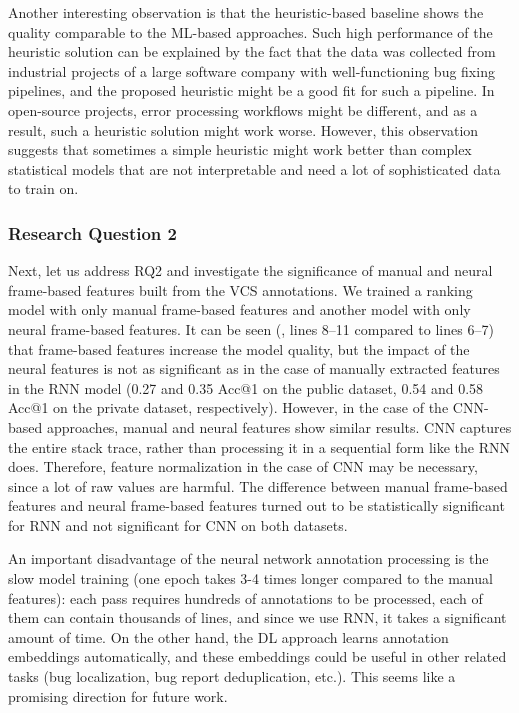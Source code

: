 Another interesting observation is that the heuristic-based baseline shows the quality comparable to the ML-based approaches. Such high performance of the heuristic solution can be explained by the fact that the data was collected from industrial projects of a large software company with well-functioning bug fixing pipelines, and the proposed heuristic might be a good fit for such a pipeline. In open-source projects, error processing workflows might be different, and as a result, such a heuristic solution might work worse. However, this observation suggests that sometimes a simple heuristic might work better than complex statistical models that are not interpretable and need a lot of sophisticated data to train on.


\subsubsection{Research Question 2} 
Next, let us address RQ2 and investigate the significance of manual and neural frame-based features built from the VCS annotations. We trained a ranking model with only manual frame-based features and another model with only neural frame-based features. It can be seen (, lines 8--11 compared to lines 6--7) that frame-based features increase the model quality, but the impact of the neural features is not as significant as in the case of manually extracted features in the RNN model (0.27 and 0.35 Acc@1 on the public dataset, 0.54 and 0.58 Acc@1 on the private dataset, respectively). However, in the case of the CNN-based approaches, manual and neural features show similar results. CNN captures the entire stack trace, rather than processing it in a sequential form like the RNN does. Therefore, feature normalization in the case of CNN may be necessary, since a lot of raw values are harmful. The difference between manual frame-based features and neural frame-based features turned out to be statistically significant for RNN and not significant for CNN on both datasets.

An important disadvantage of the neural network annotation processing is the slow model training (one epoch takes 3-4 times longer compared to the manual features): each pass requires hundreds of annotations to be processed, each of them can contain thousands of lines, and since we use RNN, it takes a significant amount of time. On the other hand, the DL approach learns annotation embeddings automatically, and these embeddings could be useful in other related tasks (bug localization, bug report deduplication, etc.). This seems like a promising direction for future work.

